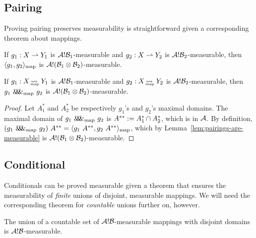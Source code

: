\subsection{Pairing}
Proving pairing preserves measurability is straightforward given a corresponding theorem about mappings.

\begin{lemma}
\label{lem:pairings-are-measurable}
If $g_1 : X \rightharpoonup Y_1$ is $\mathcal{A}!\mathcal{B}_1$-measurable and $g_2 : X \rightharpoonup Y_2$ is $\mathcal{A}!\mathcal{B}_2$-measurable, then $\langle{g_1,g_2}\rangle_\mathrm{map}$ is $\mathcal{A}!(\mathcal{B}_1 \otimes \mathcal{B}_2)$-measurable.%
\end{lemma}

\begin{theorem}
If $g_1 : X \operatorname{\rightsquigarrow_{\mspace{-23mu}_\mathrm{map}}} Y_1$ is $\mathcal{A}!\mathcal{B}_1$-measurable and $g_2 : X \operatorname{\rightsquigarrow_{\mspace{-23mu}_\mathrm{map}}} Y_2$ is $\mathcal{A}!\mathcal{B}_2$-measurable, then $g_1~\mathit{\&\mspace{-7.5mu}\&\mspace{-7.5mu}\&}_\mathrm{map}~g_2$ is $\mathcal{A}!(\mathcal{B}_1 \otimes \mathcal{B}_2)$-measurable.
\end{theorem}
\begin{proof}
Let $A_1^*$ and $A_2^*$ be respectively $g_1$'s and $g_2$'s maximal domains.
The maximal domain of $g_1~\mathit{\&\mspace{-7.5mu}\&\mspace{-7.5mu}\&}_\mathrm{map}~g_2$ is $A^{**} := A_1^* \cap A_2^*$, which is in $\mathcal{A}$.
By definition, $(g_1~\mathit{\&\mspace{-7.5mu}\&\mspace{-7.5mu}\&}_\mathrm{map}~g_2)~A^{**} = \langle{g_1~A^{**},g_2~A^{**}}\rangle_\mathrm{map}$, which by Lemma~\ref{lem:pairings-are-measurable} is $\mathcal{A}!(\mathcal{B}_1 \otimes \mathcal{B}_2)$-measurable.
\end{proof}

\subsection{Conditional}
Conditionals can be proved measurable given a theorem that ensures the measurability of \emph{finite} unions of disjoint, measurable mappings.
We will need the corresponding theorem for \emph{countable} unions further on, however.

\begin{lemma}
\label{lem:union-of-measurable-mappings}
The union of a countable set of $\mathcal{A}!\mathcal{B}$-measurable mappings with disjoint domains is $\mathcal{A}!\mathcal{B}$-measurable.%
\end{lemma}

